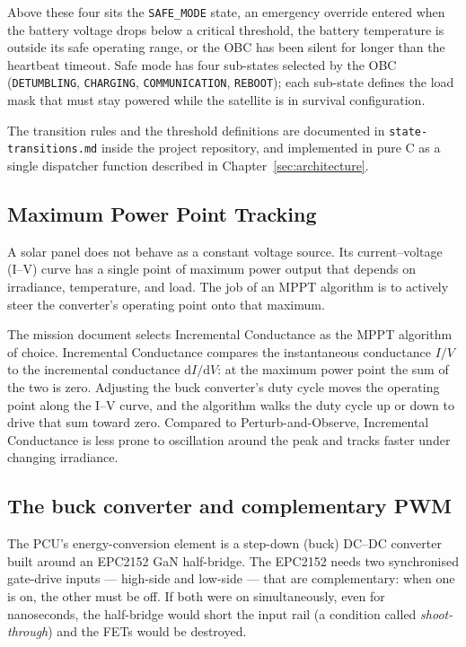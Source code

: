 Above these four sits the \texttt{SAFE\_MODE} state, an emergency
override entered when the battery voltage drops below a critical
threshold, the battery temperature is outside its safe operating
range, or the OBC has been silent for longer than the heartbeat
timeout. Safe mode has four sub-states selected by the OBC
(\texttt{DETUMBLING}, \texttt{CHARGING}, \texttt{COMMUNICATION},
\texttt{REBOOT}); each sub-state defines the load mask that must
stay powered while the satellite is in survival configuration.

The transition rules and the threshold definitions are documented
in \texttt{state-transitions.md} inside the project repository, and
implemented in pure C as a single dispatcher function described in
Chapter~\ref{sec:architecture}.

\subsection{Maximum Power Point Tracking}

A solar panel does not behave as a constant voltage source. Its
current--voltage (I--V) curve has a single point of maximum power
output that depends on irradiance, temperature, and load. The job
of an MPPT algorithm is to actively steer the converter's operating
point onto that maximum.

The mission document selects Incremental Conductance as the MPPT
algorithm of choice. Incremental Conductance compares the
instantaneous conductance $I/V$ to the incremental conductance
$\mathrm{d}I/\mathrm{d}V$: at the maximum power point the sum of
the two is zero. Adjusting the buck converter's duty cycle moves
the operating point along the I--V curve, and the algorithm walks
the duty cycle up or down to drive that sum toward zero. Compared
to Perturb-and-Observe, Incremental Conductance is less prone to
oscillation around the peak and tracks faster under changing
irradiance.

\subsection{The buck converter and complementary PWM}

The PCU's energy-conversion element is a step-down (buck) DC--DC
converter built around an EPC2152 GaN half-bridge. The EPC2152
needs two synchronised gate-drive inputs --- high-side and
low-side --- that are complementary: when one is on, the other must
be off. If both were on simultaneously, even for nanoseconds, the
half-bridge would short the input rail (a condition called
\textit{shoot-through}) and the FETs would be destroyed.

